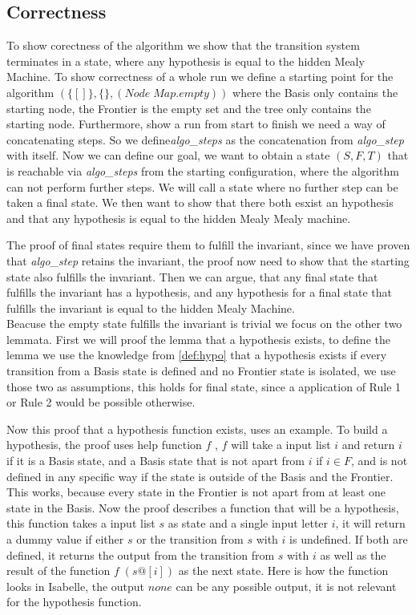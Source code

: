 \subsection{Correctness}
To show corectness of the algorithm we show that the transition system terminates in a state, where any hypothesis is equal to the hidden Mealy Machine. To show correctness of a whole run we define a starting point for the algorithm $(\{[]\},\{\},(Node \; Map.empty))$ where the Basis only contains the starting node, the Frontier is the empty set and the tree only contains the starting node. Furthermore, show a run from start to finish we need a way of concatenating steps. So we define\textit{algo\_steps} as the concatenation from \textit{algo\_step} with itself. Now we can define our goal, we want to obtain a state $(S,F,T)$ that is reachable via \textit{algo\_steps} from the starting configuration, where the algorithm can not perform further steps. We will call a state where no further step can be taken a final state. We then want to show that there both esxist an hypothesis and that any hypothesis is equal to the hidden Mealy Mealy machine.
\begin{myisabelle}
	\corollary
\end{myisabelle}
The proof of final states require them to fulfill the invariant, since we have proven that \textit{algo\_step} retains the invariant, the proof now need to show that the starting state also fulfills the invariant. Then we can argue, that any final state that fulfills the invariant has a hypothesis, and any hypothesis for a final state that fulfills the invariant is equal to the hidden Mealy Machine. \\
Beacuse the empty state fulfills the invariant is trivial we focus on the other two lemmata. First we will proof the lemma that a hypothesis exists, to define the lemma we use the knowledge from \autoref{def:hypo} that a hypothesis exists if every transition from a Basis state is defined and no Frontier state is isolated, we use those two as assumptions, this holds for final state, since a application of Rule 1 or Rule 2 would be possible otherwise.
\begin{myisabelle}
	\existshypothesis
\end{myisabelle}
 Now this proof that a hypothesis function exists, uses an example. To build a hypothesis, the proof uses help function $f$ , $f$ will take a input list $i$ and return $i$ if it is a Basis state, and a Basis state that is not apart from $i$ if $i\in F$, and is not defined in any specific way if the state is outside of the Basis and the Frontier. This works, because every state in the Frontier is not apart from at least one state in the Basis. Now the proof describes a function that will be a hypothesis, this function takes a input list $s$ as state and a single input letter $i$, it will return a dummy value if either $s$ or the transition from $s$ with $i$ is undefined. If both are defined, it returns the output from the transition from $s$ with $i$ as well as the result of the function $f\; (s@[i])$ as the next state. Here is how the function looks in Isabelle, the output $none$ can be any possible output, it is not relevant for the hypothesis function.
